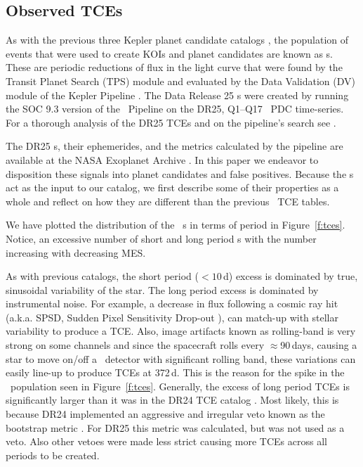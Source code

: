 \subsection{Observed TCEs}

\label{s:tces}
As with the previous three Kepler planet candidate catalogs \citep{Coughlin2016,Mullally2015cat,Rowe2015cat}, the population of events that were used to create KOIs and planet candidates are known as \opstce s. These are periodic reductions of flux in the light curve that were found by the Transit Planet Search (TPS) module and evaluated by the Data Validation (DV) module of the Kepler Pipeline \citep{JenkinsKDPH}.   The Data Release 25 \opstce s were created by running the SOC 9.3 version of the \Kepler\ Pipeline on the DR25, Q1--Q17 \Kepler\ PDC time-series.  For a thorough analysis of the DR25 TCEs and on the pipeline's search see \citet{Twicken2016}. 

The DR25 \opstce s, their ephemerides, and the metrics calculated by the pipeline are available at the NASA Exoplanet Archive \citep{Akeson2013}.  In this paper we endeavor to disposition these signals into planet candidates and false positives.  Because the \opstce s act as the input to our catalog, we first describe some of their properties as a whole and reflect on how they are different than the previous \Kepler\ TCE tables.

We have plotted the distribution of the \ntcesnorogue\ \opstce s in terms of period in Figure~\ref{f:tces}. Notice, an excessive number of short and long period \opstce s with the number increasing with decreasing MES. 

As with previous catalogs, the short period ($<10$\,d) excess is dominated by true, sinusoidal variability of the star. The long period excess is dominated by instrumental noise. For example, a decrease in flux following a cosmic ray hit (a.k.a. SPSD, Sudden Pixel Sensitivity Drop-out \citep{KDCH}), can match-up with stellar variability to produce a TCE. Also, image artifacts known as rolling-band is very strong on some channels \citep[see \S6.7 of][]{KIH}  and since the spacecraft rolls every $\approx$90\,days, causing a star to move on/off a \Kepler\ detector with significant rolling band, these variations can easily line-up to produce TCEs at 372\,d. This is the reason for the spike in the \opstce\ population seen in Figure~\ref{f:tces}. Generally, the excess of long period TCEs is significantly larger than it was in the DR24 TCE catalog \citep{Seader2015}. Most likely, this is because DR24 implemented an aggressive and irregular veto known as the bootstrap metric \citep{JenkinsBootstrap}.  For DR25 this metric was calculated, but was not used as a veto. Also other vetoes were made less strict causing more TCEs across all periods to be created. 

